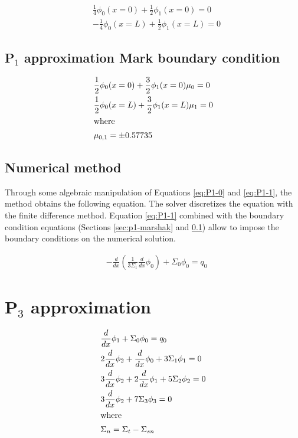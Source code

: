 \documentclass[letterpaper]{article}
\begin{document}
\begin{align}
    & \frac{1}{4}\phi_0 (x=0) + \frac{1}{2}\phi_1 (x=0)  = 0   \\
    & -\frac{1}{4}\phi_0 (x=L) + \frac{1}{2}\phi_1 (x=L) = 0
\end{align}

\subsection{P$_1$ approximation Mark boundary condition}
\label{sec:p1-mark}

\begin{align}
    & \frac{1}{2}\phi_0 (x=0) + \frac{3}{2}\phi_1 (x=0) \mu_0 = 0  \\
    & \frac{1}{2}\phi_0 (x=L) + \frac{3}{2}\phi_1 (x=L) \mu_1 = 0  \\
    \intertext{where}
    & \mu_{0,1} = \pm 0.57735 \notag
\end{align}

\subsection{Numerical method}

Through some algebraic manipulation of Equations \ref{eq:P1-0} and \ref{eq:P1-1}, the method obtains the following equation.
The solver discretizes the equation with the finite difference method.
Equation \ref{eq:P1-1} combined with the boundary condition equations (Sections \ref{sec:p1-marshak} and \ref{sec:p1-mark}) allow to impose the boundary conditions on the numerical solution.

\begin{align}
    & -\frac{d}{dx}\left(\frac{1}{3\Sigma_1} \frac{d}{dx}\phi_0 \right) + \Sigma_0 \phi_0 = q_0
\end{align}

\section{P$_3$ approximation}

\begin{align}
    & \frac{d}{dx}\phi_1 + \Sigma_0 \phi_0 = q_0  \label{eq:P3-0} \\
    & 2 \frac{d}{dx}\phi_2 + \frac{d}{dx}\phi_0 + 3 \Sigma_1 \phi_1 = 0  \label{eq:P3-1} \\
    & 3 \frac{d}{dx}\phi_2 + 2\frac{d}{dx}\phi_1 + 5 \Sigma_2 \phi_2 = 0 \label{eq:P3-2} \\
    & 3\frac{d}{dx}\phi_2 + 7 \Sigma_3 \phi_3 = 0  \label{eq:P3-3} \\
    \intertext{where}
    & \Sigma_n = \Sigma_t - \Sigma_{sn} \notag
\end{align}
\end{document}
